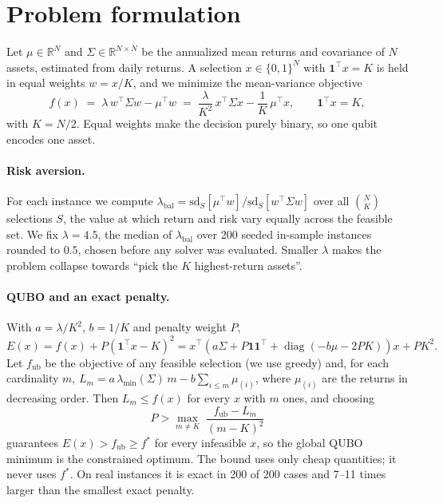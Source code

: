 \documentclass[11pt]{article}
\begin{document}
\section{Problem formulation}\label{sec:problem}
Let $\mu\in\mathbb{R}^N$ and $\Sigma\in\mathbb{R}^{N\times N}$ be the annualized mean returns and
covariance of $N$ assets, estimated from daily returns. A selection $x\in\{0,1\}^N$ with
$\mathbf{1}^\top x=K$ is held in equal weights $w=x/K$, and we minimize the mean-variance objective
\begin{equation}
  f(x) \;=\; \lambda\, w^\top\Sigma w - \mu^\top w
       \;=\; \frac{\lambda}{K^2}\, x^\top\Sigma x - \frac{1}{K}\,\mu^\top x ,
  \qquad \mathbf{1}^\top x = K,
  \label{eq:objective}
\end{equation}
with $K=N/2$. Equal weights make the decision purely binary, so one qubit encodes one asset.

\paragraph{Risk aversion.} For each instance we compute
$\lambda_{\mathrm{bal}}=\mathrm{sd}_S[\mu^\top w]/\mathrm{sd}_S[w^\top\Sigma w]$ over all
$\binom{N}{K}$ selections $S$, the value at which return and risk vary equally across the feasible
set. We fix $\lambda=4.5$, the median of $\lambda_{\mathrm{bal}}$ over 200 seeded in-sample
instances rounded to $0.5$, chosen before any solver was evaluated. Smaller $\lambda$ makes the
problem collapse towards ``pick the $K$ highest-return assets''.

\paragraph{QUBO and an exact penalty.} With $a=\lambda/K^2$, $b=1/K$ and penalty weight $P$,
\begin{equation}
  E(x) = f(x) + P(\mathbf{1}^\top x - K)^2
       = x^\top\!\left(a\Sigma + P\mathbf{1}\mathbf{1}^\top + \operatorname{diag}(-b\mu - 2PK)\right)\! x + PK^2 .
\end{equation}
Let $f_{\mathrm{ub}}$ be the objective of any feasible selection (we use greedy) and, for each
cardinality $m$, $L_m = a\,\lambda_{\min}(\Sigma)\,m - b\sum_{i\le m}\mu_{(i)}$, where $\mu_{(i)}$
are the returns in decreasing order. Then $L_m\le f(x)$ for every $x$ with $m$ ones, and choosing
\begin{equation}
  P > \max_{m\ne K}\; \frac{f_{\mathrm{ub}} - L_m}{(m-K)^2}
  \label{eq:penalty}
\end{equation}
guarantees $E(x) > f_{\mathrm{ub}} \ge f^\ast$ for every infeasible $x$, so the global QUBO minimum
is the constrained optimum. The bound uses only cheap quantities; it never uses $f^\ast$. On real
instances it is exact in 200 of 200 cases and 7--11 times larger than the smallest exact penalty.
\end{document}
